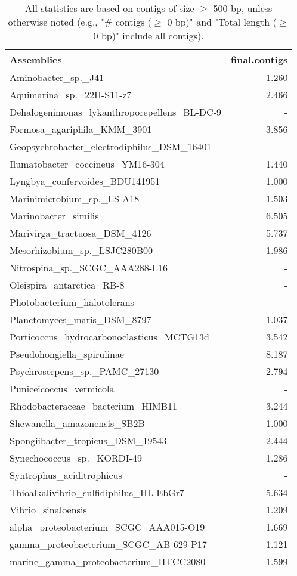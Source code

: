 \documentclass[12pt,a4paper]{article}
\begin{document}
\begin{table}[ht]
\begin{center}
\caption{All statistics are based on contigs of size $\geq$ 500 bp, unless otherwise noted (e.g., "\# contigs ($\geq$ 0 bp)" and "Total length ($\geq$ 0 bp)" include all contigs).}
\begin{tabular}{|l*{1}{|r}|}
\hline
Assemblies & final.contigs \\ \hline
Aminobacter\_sp.\_J41 & 1.260 \\ \hline
Aquimarina\_sp.\_22II-S11-z7 & 2.466 \\ \hline
Dehalogenimonas\_lykanthroporepellens\_BL-DC-9 & - \\ \hline
Formosa\_agariphila\_KMM\_3901 & 3.856 \\ \hline
Geopsychrobacter\_electrodiphilus\_DSM\_16401 & - \\ \hline
Ilumatobacter\_coccineus\_YM16-304 & 1.440 \\ \hline
Lyngbya\_confervoides\_BDU141951 & 1.000 \\ \hline
Marinimicrobium\_sp.\_LS-A18 & 1.503 \\ \hline
Marinobacter\_similis & 6.505 \\ \hline
Marivirga\_tractuosa\_DSM\_4126 & 5.737 \\ \hline
Mesorhizobium\_sp.\_LSJC280B00 & 1.986 \\ \hline
Nitrospina\_sp.\_SCGC\_AAA288-L16 & - \\ \hline
Oleispira\_antarctica\_RB-8 & - \\ \hline
Photobacterium\_halotolerans & - \\ \hline
Planctomyces\_maris\_DSM\_8797 & 1.037 \\ \hline
Porticoccus\_hydrocarbonoclasticus\_MCTG13d & 3.542 \\ \hline
Pseudohongiella\_spirulinae & 8.187 \\ \hline
Psychroserpens\_sp.\_PAMC\_27130 & 2.794 \\ \hline
Puniceicoccus\_vermicola & - \\ \hline
Rhodobacteraceae\_bacterium\_HIMB11 & 3.244 \\ \hline
Shewanella\_amazonensis\_SB2B & 1.000 \\ \hline
Spongiibacter\_tropicus\_DSM\_19543 & 2.444 \\ \hline
Synechococcus\_sp.\_KORDI-49 & 1.286 \\ \hline
Syntrophus\_aciditrophicus & - \\ \hline
Thioalkalivibrio\_sulfidiphilus\_HL-EbGr7 & 5.634 \\ \hline
Vibrio\_sinaloensis & 1.209 \\ \hline
alpha\_proteobacterium\_SCGC\_AAA015-O19 & 1.669 \\ \hline
gamma\_proteobacterium\_SCGC\_AB-629-P17 & 1.121 \\ \hline
marine\_gamma\_proteobacterium\_HTCC2080 & 1.599 \\ \hline
\end{tabular}
\end{center}
\end{table}
\end{document}
